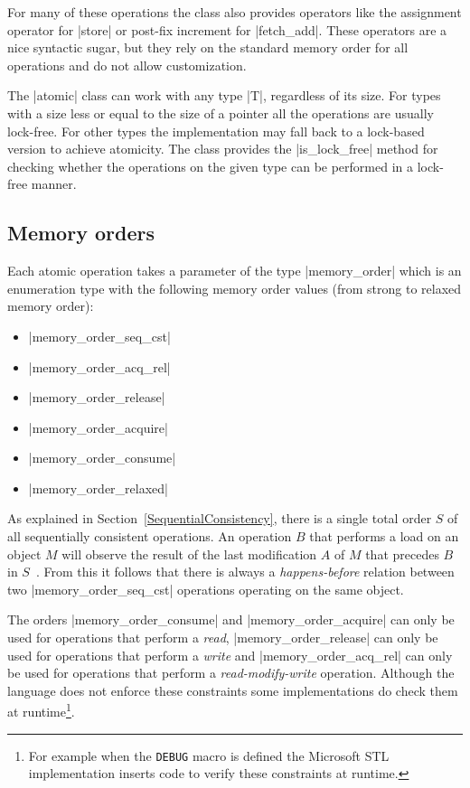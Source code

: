 \documentclass[a4paper,12pt,notitlepage,twoside,openright]{article}
\begin{document}
For many of these operations the class also provides operators like
the assignment operator for |store| or post-fix increment for
|fetch_add|. These operators are a nice syntactic sugar, but they rely
on the standard memory order for all operations and do not allow
customization.

The |atomic| class can work with any type |T|, regardless of its
size. For types with a size less or equal to the size of a pointer all
the operations are usually lock-free. For other types the
implementation may fall back to a lock-based version to achieve
atomicity. The class provides the |is_lock_free| method for checking
whether the operations on the given type can be performed in a
lock-free manner.

\subsection{Memory orders}
\label{sec:C++11-Memory-Orders}
Each atomic operation takes a parameter of the type |memory_order|
which is an enumeration type with the following memory order values
(from strong to relaxed memory order):
\begin{itemize}
	\item |memory_order_seq_cst|
	\item |memory_order_acq_rel|
	\item |memory_order_release|
	\item |memory_order_acquire|
	\item |memory_order_consume|
	\item |memory_order_relaxed|
\end{itemize}

As explained in Section~\ref{SequentialConsistency}, there is a single
total order $S$ of all sequentially consistent operations. An
operation $B$ that performs a load on an object $M$ will observe the
result of the last modification $A$ of $M$ that precedes $B$ in
$S$~\cite[29.3.3, p. 1104]{c++11_standard}. From this it follows that
there is always a \emph{happens-before} relation between two
|memory_order_seq_cst| operations operating on the same object.

The orders |memory_order_consume| and |memory_order_acquire| can only
be used for operations that perform a \emph{read},
|memory_order_release| can only be used for operations that perform a
\emph{write} and |memory_order_acq_rel| can only be used for
operations that perform a \emph{read-modify-write} operation.
Although the language does not enforce these constraints some
implementations do check them at runtime\footnote{For example when the
  \lstinline|DEBUG| macro is defined the Microsoft STL implementation
  inserts code to verify these constraints at runtime.}.
\end{document}
